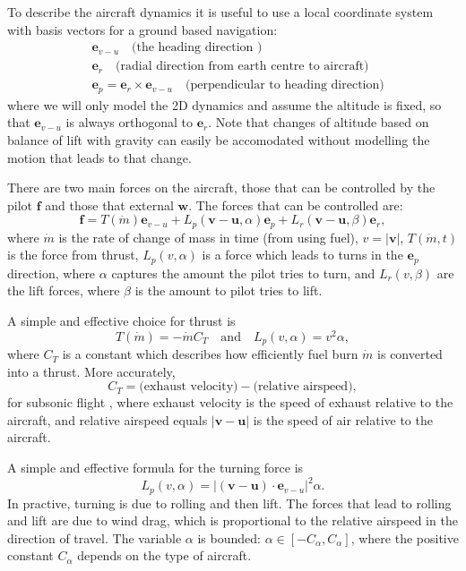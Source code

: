 \documentclass{article}
\renewcommand{\vec}[1]{\boldsymbol{#1}}
\begin{document}
To describe the aircraft dynamics it is useful to use a local coordinate system with basis vectors for a ground based navigation:
\begin{align}
    & \vec e_{v-u} \quad \text{(the heading direction )}
    \\
    & \vec e_r \quad \text{(radial direction from earth centre to aircraft)}
    \\
    & \vec e_p = \vec e_r \times \vec e_{v-u}  \quad \text{(perpendicular to heading direction)}
\end{align}
where we will only model the 2D dynamics and assume the altitude is fixed, so that $\vec e_{v-u}$ is always orthogonal to $\vec e_r$. Note that changes of altitude based on balance of lift with gravity can easily be accomodated without modelling the motion that leads to that change. 

There are two main forces on the aircraft, those that can be controlled by the pilot $\vec f$ and those that external $\vec w$. The forces that can be controlled are: 
\begin{equation}
    \vec{f} =  T(\dot{m}) \vec{e}_{v-u} + {L_p}(\vec v - \vec u, \alpha) \vec{e}_p  + {L_r}(\vec v - \vec u,\beta) \vec{e}_r,
\end{equation}
where $\dot m$ is the rate of change of mass in time (from using fuel), $v = |\vec v|$, $T(\dot{m},t)$ is the force from thrust, ${L_p}(v, \alpha)$ is a force which leads to turns in the $\vec e_p$ direction, where $\alpha$ captures the amount the pilot tries to turn, and $L_r(v,\beta)$ are the lift forces, where $\beta$ is the amount to pilot tries to lift. 

A simple and effective choice for thrust is
\begin{equation}
    T(\dot{m}) = - \dot m C_{T} \quad \text{and} \quad 
    L_p (v, \alpha) = v^2 \alpha,
\end{equation}
where $C_T$ is a constant which describes how efficiently fuel burn $\dot m$ is converted into a thrust. More accurately, 
\[
C_T = \text{(exhaust velocity)} - \text{(relative airspeed)},
\] 
for subsonic flight \cite[Chapter 4]{anderson2005introduction}, where exhaust velocity is the speed of exhaust relative to the aircraft, and relative airspeed equals $|\vec v - \vec u|$ is the speed of air relative to the aircraft.

A simple and effective formula for the turning force is
\begin{equation}
    L_p (v, \alpha) = |(\vec v - \vec u) \cdot \vec e_{v-u}|^2 \alpha.
\end{equation}
In practive, turning is due to rolling and then lift. The forces that lead to rolling and lift are due to wind drag, which is proportional to the relative airspeed in the direction of travel. The variable $\alpha$ is bounded: $\alpha \in [-C_\alpha, C_\alpha]$, where the positive constant $C_\alpha$ depends on the type of aircraft.
\end{document}
